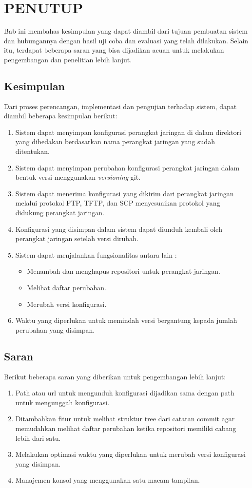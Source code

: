 \chapter{PENUTUP}
    Bab ini membahas kesimpulan yang dapat diambil dari tujuan pembuatan sistem dan hubungannya dengan hasil uji coba dan evaluasi yang telah dilakukan. Selain itu, terdapat beberapa saran yang bisa dijadikan acuan untuk melakukan pengembangan dan penelitian lebih lanjut.
        
	\section{Kesimpulan}
        Dari proses perencangan, implementasi dan pengujian terhadap sistem, dapat diambil beberapa kesimpulan berikut:
		\begin{enumerate}
			\item Sistem dapat menyimpan konfigurasi perangkat jaringan di dalam direktori yang dibedakan berdasarkan nama perangkat jaringan yang sudah ditentukan.
			\item Sistem dapat menyimpan perubahan konfigurasi perangkat jaringan dalam bentuk versi menggunakan \textit{versioning} git.
			\item Sistem dapat menerima konfigurasi yang dikirim dari perangkat jaringan melalui protokol FTP, TFTP, dan SCP menyesuaikan protokol yang didukung perangkat jaringan.
       		\item Konfigurasi yang disimpan dalam sistem dapat diunduh kembali oleh perangkat jaringan setelah versi dirubah.
            \item Sistem dapat menjalankan fungsionalitas antara lain :
            	\begin{itemize}
            		\item Menambah dan menghapus repositori untuk perangkat jaringan.
            		\item Melihat daftar perubahan.
            		\item Merubah versi konfigurasi.
            	\end{itemize}
            \item Waktu yang diperlukan untuk memindah versi bergantung kepada jumlah perubahan yang disimpan.
		\end{enumerate}
        
	\section{Saran}
		Berikut beberapa saran yang diberikan untuk pengembangan lebih lanjut:
		\begin{enumerate}
			\item Path atau url untuk mengunduh konfigurasi dijadikan sama dengan path untuk mengunggah konfigurasi.
			\item Ditambahkan fitur untuk melihat struktur tree dari catatan commit agar memudahkan melihat daftar perubahan ketika repositori memiliki cabang lebih dari satu.
			\item Melakukan optimasi waktu yang diperlukan untuk merubah versi konfigurasi yang disimpan.
			\item Manajemen konsol yang menggunakan satu macam tampilan.
		\end{enumerate}